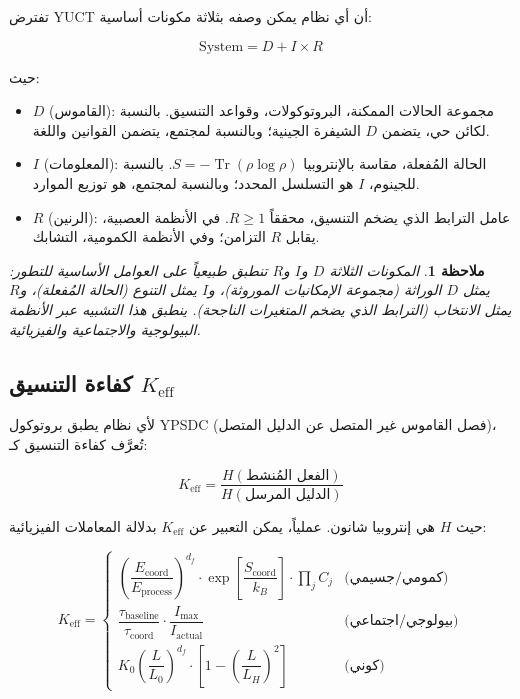 \documentclass[11pt,a4paper]{article}
\newcommand{\Keff}{K_{\mathrm{eff}}}
\newcommand{\df}{d_{\!f}}
\DeclareMathOperator{\Tr}{Tr}
\newtheorem{remark}[theorem]{ملاحظة}
\begin{document}
	تفترض YUCT أن أي نظام يمكن وصفه بثلاثة مكونات أساسية:
	
	\begin{equation}
		\text{System} = D + I \times R
		\label{eq:triad}
	\end{equation}
	
	حيث:
	\begin{itemize}
		\item \(D\) (القاموس): مجموعة الحالات الممكنة، البروتوكولات، وقواعد التنسيق. بالنسبة لكائن حي، يتضمن \(D\) الشيفرة الجينية؛ وبالنسبة لمجتمع، يتضمن القوانين واللغة.
		\item \(I\) (المعلومات): الحالة المُفعلة، مقاسة بالإنتروبيا \(S = -\Tr(\rho \log \rho)\). بالنسبة للجينوم، \(I\) هو التسلسل المحدد؛ وبالنسبة لمجتمع، هو توزيع الموارد.
		\item \(R\) (الرنين): عامل الترابط الذي يضخم التنسيق، محققاً \(R \geq 1\). في الأنظمة العصبية، يقابل \(R\) التزامن؛ وفي الأنظمة الكمومية، التشابك.
	\end{itemize}
	
	\begin{remark}
		المكونات الثلاثة \(D\) و\(I\) و\(R\) تنطبق طبيعياً على العوامل الأساسية للتطور: يمثل \(D\) الوراثة (مجموعة الإمكانيات الموروثة)، و\(I\) يمثل التنوع (الحالة المُفعلة)، و\(R\) يمثل الانتخاب (الترابط الذي يضخم المتغيرات الناجحة). ينطبق هذا التشبيه عبر الأنظمة البيولوجية والاجتماعية والفيزيائية.
	\end{remark}
	
	\subsection{كفاءة التنسيق \(\Keff\)}
	
	لأي نظام يطبق بروتوكول YPSDC (فصل القاموس غير المتصل عن الدليل المتصل)، تُعرَّف كفاءة التنسيق كـ:
	
	\begin{equation}
		\Keff = \frac{H(\text{الفعل المُنشط})}{H(\text{الدليل المرسل})}
		\label{eq:keff-def}
	\end{equation}
	
	حيث \(H\) هي إنتروبيا شانون. عملياً، يمكن التعبير عن \(\Keff\) بدلالة المعاملات الفيزيائية:
	
	\begin{equation}
		\Keff = 
		\begin{cases}
			\left(\dfrac{E_{\text{coord}}}{E_{\text{process}}}\right)^{\df} \cdot \exp\left[\dfrac{S_{\text{coord}}}{k_B}\right] \cdot \prod_j C_j & \text{(كمومي/جسيمي)} \\[1em]
			\dfrac{\tau_{\text{baseline}}}{\tau_{\text{coord}}} \cdot \dfrac{I_{\text{max}}}{I_{\text{actual}}} & \text{(بيولوجي/اجتماعي)} \\[1em]
			K_0 \left(\dfrac{L}{L_0}\right)^{\df} \cdot \left[1 - \left(\dfrac{L}{L_H}\right)^2\right] & \text{(كوني)}
		\end{cases}
		\label{eq:keff-cases}
	\end{equation}
	
\end{document}
